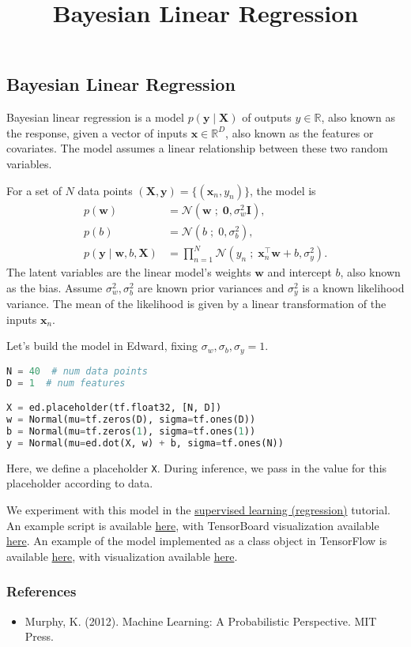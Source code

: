 \title{Bayesian Linear Regression}

\subsection{Bayesian Linear Regression}


Bayesian linear regression is a model $p(\mathbf{y}\mid \mathbf{X})$ of
outputs $y\in\mathbb{R}$, also known as the response, given
a vector of inputs
$\mathbf{x}\in\mathbb{R}^D$, also known as the features or covariates.
The model assumes a
linear relationship between these two random variables.

For a set of $N$ data points $(\mathbf{X},\mathbf{y})=\{(\mathbf{x}_n, y_n)\}$,
the model is
\begin{align*}
  p(\mathbf{w})
  &=
  \mathcal{N}(\mathbf{w} \;;\; \mathbf{0}, \sigma_w^2\mathbf{I}),
  \\[1.5ex]
  p(b)
  &=
  \mathcal{N}(b \;;\; 0, \sigma_b^2),
  \\
  p(\mathbf{y} \mid \mathbf{w}, b, \mathbf{X})
  &=
  \prod_{n=1}^N
  \mathcal{N}(y_n \;;\; \mathbf{x}_n^\top\mathbf{w} + b, \sigma_y^2).
\end{align*}
The latent variables are the linear model's weights $\mathbf{w}$ and
intercept $b$, also known as the bias.
Assume $\sigma_w^2,\sigma_b^2$ are known prior variances and $\sigma_y^2$ is a
known likelihood variance. The mean of the likelihood is given by a
linear transformation of the inputs $\mathbf{x}_n$.

Let's build the model in Edward, fixing $\sigma_w,\sigma_b,\sigma_y=1$.
\begin{lstlisting}[language=Python]
N = 40  # num data points
D = 1  # num features

X = ed.placeholder(tf.float32, [N, D])
w = Normal(mu=tf.zeros(D), sigma=tf.ones(D))
b = Normal(mu=tf.zeros(1), sigma=tf.ones(1))
y = Normal(mu=ed.dot(X, w) + b, sigma=tf.ones(N))
\end{lstlisting}
Here, we define a placeholder \texttt{X}. During inference, we pass in
the value for this placeholder according to data.

We experiment with this model in the \href{tut_supervised_regression}{supervised
learning (regression)} tutorial.
An example script is available
\href{https://github.com/blei-lab/edward/blob/master/examples/bayesian_linear_regression.py}
{here}, with TensorBoard visualization available
\href{https://github.com/blei-lab/edward/blob/master/examples/bayesian_linear_regression_tensorboard.py}
{here}.
An example of the model implemented as a class object in TensorFlow is
available
\href{https://github.com/blei-lab/edward/blob/master/examples/tf_bayesian_linear_regression.py}
{here}, with visualization available
\href{https://github.com/blei-lab/edward/blob/master/examples/tf_bayesian_linear_regression_plot.py}
{here}.

\subsubsection{References}\label{references}

\begin{itemize}
\item
  Murphy, K. (2012). Machine Learning: A Probabilistic Perspective. MIT Press.
\end{itemize}
